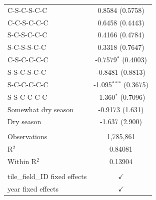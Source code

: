 \begin{table}[H]
\begin{tabular}{lc}
      C-S-C-S-C-C                     & 0.8584 (0.5758)\\   
      C-C-S-C-C-C                     & 0.6458 (0.4443)\\   
      S-C-S-C-C-C                     & 0.4166 (0.4784)\\   
      S-C-S-S-C-C                     & 0.3318 (0.7647)\\   
      C-S-C-C-C-C                     & -0.7579$^{*}$ (0.4003)\\   
      S-S-C-S-C-C                     & -0.8481 (0.8813)\\   
      S-C-C-C-C-C                     & -1.095$^{***}$ (0.3675)\\   
      S-S-C-C-C-C                     & -1.360$^{*}$ (0.7096)\\   
      Somewhat dry season             & -0.9173 (1.631)\\   
      Dry season                      & -1.637 (2.900)\\   
       \\
      Observations                    & 1,785,861\\  
      R$^2$                           & 0.84081\\  
      Within R$^2$                    & 0.13904\\  
       \\
      tile\_field\_ID fixed effects   & $\checkmark$\\   
      year fixed effects              & $\checkmark$\\   
      \bottomrule
   \end{tabular}
\end{table}


